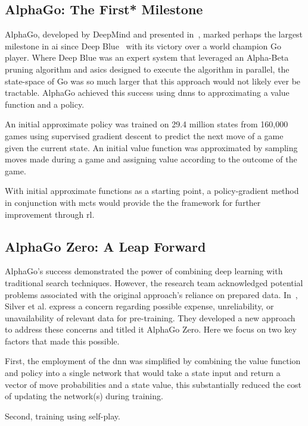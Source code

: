 \subsection*{AlphaGo: The First* Milestone}
AlphaGo, developed by DeepMind and presented in~\cite{silver2016}, 
marked perhaps the largest milestone in \gls{ai} since Deep Blue~\cite{campbell2002}
with its victory over a world champion Go player.
Where Deep Blue was an expert system that leveraged an Alpha-Beta pruning algorithm
and \glspl{asic} designed to execute the algorithm in parallel,
the state-space of Go was so much larger that this approach would not likely ever be tractable. 
AlphaGo achieved this success using \glspl{dnn} to approximating a value function and a policy.

An initial approximate policy was trained on 29.4 million states from 160,000 games
using supervised gradient descent to predict the next move of a game given the current state.
An initial value function was approximated by sampling moves made during a game
and assigning value according to the outcome of the game.

With initial approximate functions as a starting point,
a policy-gradient method in conjunction with \gls{mcts}
would provide the the framework for further improvement through \gls{rl}.

\subsection*{AlphaGo Zero: A Leap Forward}
AlphaGo's success demonstrated the power of combining deep learning with traditional 
search techniques. However, the research team acknowledged potential problems associated with 
the original approach's reliance on prepared data. 
In~\cite{silver2017}, Silver et al. express a concern regarding 
possible expense, unreliability, or unavailability of relevant data for pre-training.
They developed a new approach to address these concerns and titled it AlphaGo Zero.
Here we focus on two key factors that made this possible.

First, the employment of the \gls{dnn} was simplified by combining the value function and policy 
into a single network that would take a state input and return a vector of move probabilities and 
a state value, this substantially reduced the cost of updating the network(s) during training.




Second,
training using self-play.




